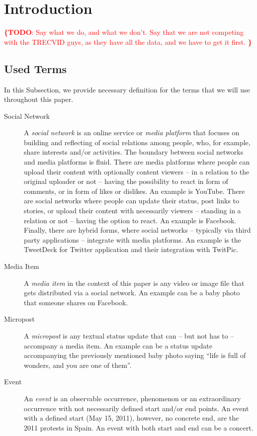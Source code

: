 \documentclass{acm_proc_article-sp}
\let\oldemph\emph
\renewcommand{\emph}[1]{\oldemph{\fontsize{9}{9}\selectfont #1}}
\newcommand{\todo}[1]{\noindent\textcolor{red}{{\bf \{TODO}: #1{\bf \}}}}
\begin{document}
\keywords{\todo{Keywords}}

\section{Introduction} \label{sec:introduction}
\todo{
Say what we do, and what we don't.
Say that we are not competing with the TRECVID guys, as they have all the data, and we have to get it first.
}

\subsection{Used Terms}
In this Subsection, we provide necessary definition for the terms that we will use throughout this paper.

\begin{description}
\item[Social Network]
A \emph{social network} is an online service or \emph{media platform} that focuses on building and reflecting of social relations among people, who, for example, share interests and/or activities.
The boundary between social networks and media platforms is fluid.
There are media platforms where people can upload their content with optionally content viewers -- in a relation to the original uploader or not -- having the possibility to react in form of comments, or in form of likes or dislikes.
An example is YouTube.
There are social networks where people can update their status, post links to stories, or upload their content with necessarily viewers -- standing in a relation or not -- having the option to react.
An example is Facebook.
Finally, there are hybrid forms, where social networks -- typically via third party applications -- integrate with media platforms.
An example is the TweetDeck for Twitter application and their integration with TwitPic.

\item[Media Item]
A \emph{media item} in the context of this paper is any video or image file that gets distributed via a social network. An example can be a baby photo that someone shares on Facebook. 

\item[Micropost]
A \emph{micropost} is any textual status update that can -- but not has to -- accompany a media item. An example can be a status update accompanying the previously mentioned baby photo saying ``life is full of wonders, and you are one of them''.

\item[Event]
An \emph{event} is an observable occurrence, phenomenon or an extraordinary occurrence with not necessarily defined start and/or end points. An event with a defined start (May 15, 2011), however, no concrete end, are the 2011 protests in Spain. An event with both start and end can be a concert.
\end{description}
\end{document}
